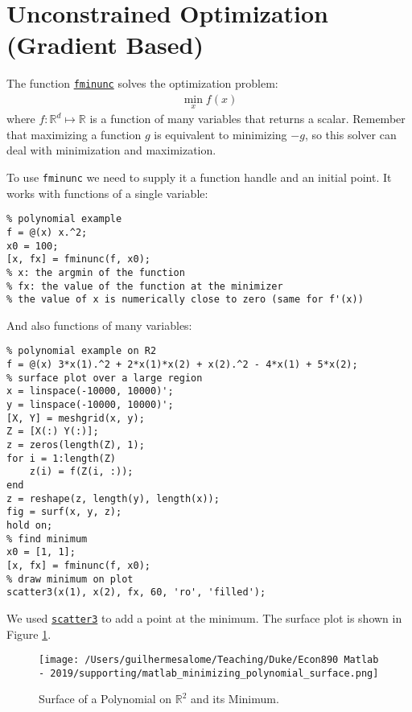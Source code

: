 \documentclass[12pt, a4paper]{article}
\begin{document}
\section{Unconstrained Optimization (Gradient Based)}
\label{sec:org60723cd}
The function \href{https://www.mathworks.com/help/optim/ug/fminunc.html?s\_tid=doc\_ta}{\texttt{fminunc}} solves the optimization problem:
\begin{align*}
\min_{x}{f(x)}
\end{align*}
where \(f:\mathbb{R}^d\mapsto\mathbb{R}\) is a function of many variables that returns a scalar.
Remember that maximizing a function \(g\) is equivalent to minimizing \(-g\), so this solver can deal with minimization and maximization.

To use \texttt{fminunc} we need to supply it a function handle and an initial point.
It works with functions of a single variable:
\lstset{language=matlab,label= ,caption= ,captionpos=b,firstnumber=1,numbers=left,style=Matlab-editor}
\begin{lstlisting}
% polynomial example
f = @(x) x.^2;
x0 = 100;
[x, fx] = fminunc(f, x0);
% x: the argmin of the function
% fx: the value of the function at the minimizer
% the value of x is numerically close to zero (same for f'(x))
\end{lstlisting}

And also functions of many variables:
\lstset{language=matlab,label= ,caption= ,captionpos=b,firstnumber=1,numbers=left,style=Matlab-editor}
\begin{lstlisting}
% polynomial example on R2
f = @(x) 3*x(1).^2 + 2*x(1)*x(2) + x(2).^2 - 4*x(1) + 5*x(2);
% surface plot over a large region
x = linspace(-10000, 10000)';
y = linspace(-10000, 10000)';
[X, Y] = meshgrid(x, y);
Z = [X(:) Y(:)];
z = zeros(length(Z), 1);
for i = 1:length(Z)
    z(i) = f(Z(i, :));
end
z = reshape(z, length(y), length(x));
fig = surf(x, y, z);
hold on;
% find minimum
x0 = [1, 1];
[x, fx] = fminunc(f, x0);
% draw minimum on plot
scatter3(x(1), x(2), fx, 60, 'ro', 'filled');
\end{lstlisting}
We used \href{https://www.mathworks.com/help/matlab/ref/scatter3.html}{\texttt{scatter3}} to add a point at the minimum.
The surface plot is shown in Figure \ref{fig:org15a156f}.

\begin{figure}[H]
\centering
\texttt{[image: /Users/guilhermesalome/Teaching/Duke/Econ890 Matlab - 2019/supporting/matlab\_minimizing\_polynomial\_surface.png]}
\caption{\label{fig:org15a156f}
Surface of a Polynomial on \(\mathbb{R}^2\) and its Minimum.}
\end{figure}
\end{document}
